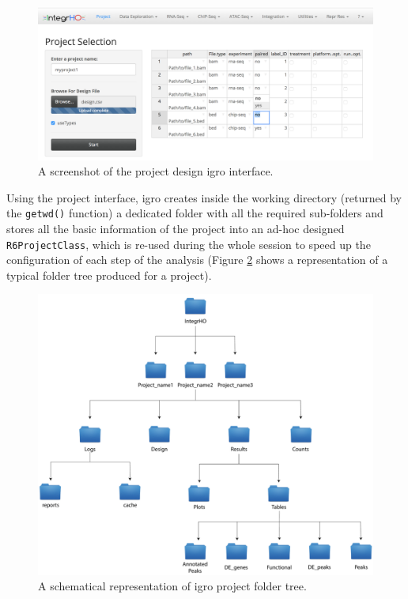 \begin{figure}[H]
\centering
\includegraphics[width=\textwidth, keepaspectratio]{img/integrho/design.png}
\caption[\gls{igro} design interface]{A screenshot of the project design \gls{igro} interface.}
\label{fig:integrhodesign}
\end{figure}

Using the project interface, \gls{igro} creates inside the working directory (returned by the \lstinline!getwd()! function) a dedicated folder with all the required sub-folders and stores all the basic information of the project into an ad-hoc designed \lstinline!R6ProjectClass!, which is re-used during the whole session to speed up the configuration of each step of the analysis (Figure \ref{fig:integrhotree} shows a representation of a typical folder tree produced for a project).

\begin{figure}[H]
\centering
\includegraphics[width=\textwidth, keepaspectratio]{img/integrho/project_folder.pdf}
\caption[\gls{igro} folder tree]{A schematical representation of \gls{igro} project folder tree.}
\label{fig:integrhotree}
\end{figure}

